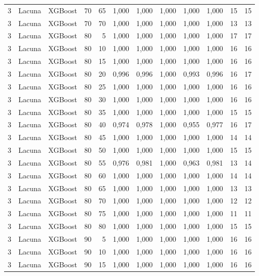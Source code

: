 \begin{longtable}{@{}rllrrrrrrrrr@{}}
3 & Lacuna & XGBoost & 70 & 65 & 1,000 & 1,000 & 1,000 & 1,000 & 1,000 & 15 & 15 \\
3 & Lacuna & XGBoost & 70 & 70 & 1,000 & 1,000 & 1,000 & 1,000 & 1,000 & 13 & 13 \\
3 & Lacuna & XGBoost & 80 & 5 & 1,000 & 1,000 & 1,000 & 1,000 & 1,000 & 17 & 17 \\
3 & Lacuna & XGBoost & 80 & 10 & 1,000 & 1,000 & 1,000 & 1,000 & 1,000 & 16 & 16 \\
3 & Lacuna & XGBoost & 80 & 15 & 1,000 & 1,000 & 1,000 & 1,000 & 1,000 & 16 & 16 \\
3 & Lacuna & XGBoost & 80 & 20 & 0,996 & 0,996 & 1,000 & 0,993 & 0,996 & 16 & 17 \\
3 & Lacuna & XGBoost & 80 & 25 & 1,000 & 1,000 & 1,000 & 1,000 & 1,000 & 16 & 16 \\
3 & Lacuna & XGBoost & 80 & 30 & 1,000 & 1,000 & 1,000 & 1,000 & 1,000 & 16 & 16 \\
3 & Lacuna & XGBoost & 80 & 35 & 1,000 & 1,000 & 1,000 & 1,000 & 1,000 & 15 & 15 \\
3 & Lacuna & XGBoost & 80 & 40 & 0,974 & 0,978 & 1,000 & 0,955 & 0,977 & 16 & 17 \\
3 & Lacuna & XGBoost & 80 & 45 & 1,000 & 1,000 & 1,000 & 1,000 & 1,000 & 14 & 14 \\
3 & Lacuna & XGBoost & 80 & 50 & 1,000 & 1,000 & 1,000 & 1,000 & 1,000 & 15 & 15 \\
3 & Lacuna & XGBoost & 80 & 55 & 0,976 & 0,981 & 1,000 & 0,963 & 0,981 & 13 & 14 \\
3 & Lacuna & XGBoost & 80 & 60 & 1,000 & 1,000 & 1,000 & 1,000 & 1,000 & 14 & 14 \\
3 & Lacuna & XGBoost & 80 & 65 & 1,000 & 1,000 & 1,000 & 1,000 & 1,000 & 13 & 13 \\
3 & Lacuna & XGBoost & 80 & 70 & 1,000 & 1,000 & 1,000 & 1,000 & 1,000 & 12 & 12 \\
3 & Lacuna & XGBoost & 80 & 75 & 1,000 & 1,000 & 1,000 & 1,000 & 1,000 & 11 & 11 \\
3 & Lacuna & XGBoost & 80 & 80 & 1,000 & 1,000 & 1,000 & 1,000 & 1,000 & 15 & 15 \\
3 & Lacuna & XGBoost & 90 & 5 & 1,000 & 1,000 & 1,000 & 1,000 & 1,000 & 16 & 16 \\
3 & Lacuna & XGBoost & 90 & 10 & 1,000 & 1,000 & 1,000 & 1,000 & 1,000 & 16 & 16 \\
3 & Lacuna & XGBoost & 90 & 15 & 1,000 & 1,000 & 1,000 & 1,000 & 1,000 & 16 & 16 \\

\end{longtable}

